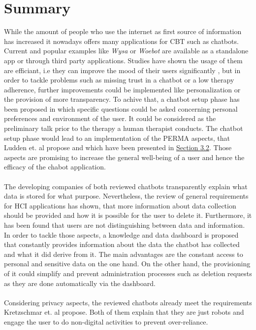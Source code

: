 \documentclass[sigconf, nonacm]{acmart}
\begin{document}
\section{Summary}
\label{sec:five}
While the amount of people who use the internet as first source of information has increased \cite{Wyatt2015} it nowadays offers many applications for CBT such as chatbots. 
\\
Current and popular examples like \emph{Wysa} or \emph{Woebot} are available as a standalone app or through third party applications. Studies have shown the usage of them are efficiant, i.e they can improve the mood of their users significantly \cite{Fitzpatrick2017,Inkster}, but in order to tackle problems such as missing trust in a chatbot or a low therapy adherence, further improvements could be implemented like personalization 
or the provision of more transparency. To achive that, a chatbot setup phase has been proposed in which specific questions could be asked concerning personal preferences and environment of the user. It could be considered as the preliminary talk prior to the therapy a human therapist conducts.
The chatbot setup phase would lead to an implementation of the PERMA aspects, that Ludden et. al \cite{Ludden2015} propose and which have been presented in \hyperref[sec:three_two]{Section 3.2}. Those aspects are promising to increase the general well-being of a user and hence the efficacy of the chabot application.
\\\\
The developing companies of both reviewed chatbots transparently explain what data is stored for what purpose.
Nevertheless, the review of general requirements for HCI applications has shown, that more information about data collection should be provided and how it is possible for the user to delete it\cite{Saglam2021}.
Furthermore, it has been found that users are not distinguishing between data and information\cite{Lee2011}.
In order to tackle those aspects, a knowledge and data dashboard is proposed that constantly provides information about the data the chatbot has collected and what it did derive from it.
The main advantages are the constant access to personal and sensitive data on the one hand. On the other hand, the provisioning of it could simplify and prevent administration processes such as deletion requests as they are done automatically via the dashboard.
\\\\
Considering privacy aspects, the reviewed chatbots already meet the requirements Kretzschmar et. al \cite{Kretzschmar2019} propose. Both of them explain that they are just robots and engage the user to do non-digital activities to prevent over-reliance.
\end{document}
